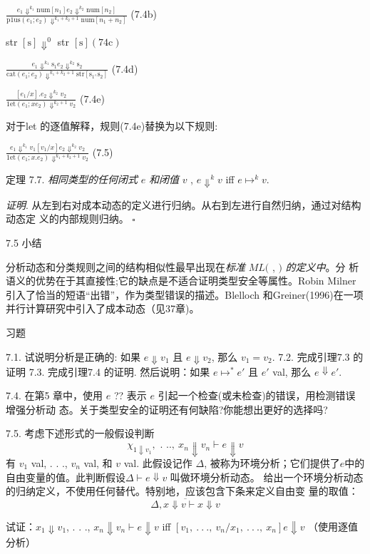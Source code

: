 \begin{center}
$\displaystyle \frac{e_{1}\Downarrow^{k_{1}}\mathrm{n}\mathrm{u}\mathrm{m}[n_{1}]e_{2}\Downarrow^{k_{2}}\mathrm{n}\mathrm{u}\mathrm{m}[n_{2}]}{\mathrm{p}1\mathrm{u}\mathrm{s}(e_{1};e_{2})\Downarrow^{k_{1}+k_{2}+1}\mathrm{n}\mathrm{u}\mathrm{m}[n_{1}+n_{2}]}$   (7.4b)
\end{center}
str $[\mathrm{s}] \Downarrow^{0}$ str $[\mathrm{s}] (74\mathrm{c})$
\begin{center}
$\displaystyle \frac{e_{1}\Downarrow^{k_{1}}\mathrm{s}_{1}e_{2}\Downarrow^{k_{2}}\mathrm{s}_{2}}{\mathrm{c}\mathrm{a}\mathrm{t}(e_{1};e_{2})\Downarrow^{k_{1}+k_{2}+1}\mathrm{s}\mathrm{t}\mathrm{r}[\mathrm{s}_{1^{\wedge}}\mathrm{s}_{2}]}$   (7.4d)

$\displaystyle \frac{[e_{1}/x].e_{2}\Downarrow^{k_{2}}v_{2}}{1\mathrm{e}\mathrm{t}(e_{1};xe_{2})\Downarrow^{k_{2}+1}v_{2}}$   (7.4e)
\end{center}
对于let 的逐值解释，规则(7.4e)替换为以下规则:
\begin{center}
$\displaystyle \frac{e_{1}\Downarrow^{k_{1}}v_{1}[v_{1}/x]e_{2}\Downarrow^{k_{2}}v_{2}}{1\mathrm{e}\mathrm{t}(e_{1};x.e_{2})\Downarrow^{k_{1}+k_{2}+1}v_{2}}$   (7.5)
\end{center}
定理 7.7. {\it 相同类型的任何闭式} $e$ {\it 和闭值} $v$ , $e\Downarrow^{k}v$ iff $e\mapsto^{k}v.$

{\it 证明}. 从左到右对成本动态的定义进行归纳。从右到左进行自然归纳，通过对结构动态定
义的内部规则归纳。 $\square $

7.5 小结

分析动态和分类规则之间的结构相似性最早出现在{\it 标准} $ML ($ , $)$ {\it 的定义中}。分
析语义的优势在于其直接性;它的缺点是不适合证明类型安全等属性。Robin Milner 引入了恰当的短语“出错”，作为类型错误的描述。Blelloch 和Greiner(1996)在一项并行计算研究中引入了成本动态（见37章)。

习题

7.1. 试说明分析是正确的:  如果 $e\Downarrow v_{1}$ 且 $e\Downarrow v_{2}$, 那么 $v_{1} =v_{2}.$
7.2.  完成引理7.3 的证明 
7.3.  完成引理7.4 的证明.  然后说明：如果 $e\mapsto^{*}e'$ 且 $e'$ val, 那么 $e\Downarrow e'.$

7.4. 在第5 章中，使用 $e$ ?? 表示 $e$ 引起一个检查(或未检查)的错误，用检测错误增强分析动
态。关于类型安全的证明还有何缺陷?你能想出更好的选择吗? 

7.5. 考虑下述形式的一般假设判断
$$
\chi_{1\Downarrow v_{1}},\text{ . }..,\ x_{n}\Downarrow v_{n}\vdash e\Downarrow v
$$
有 $v_{1}$ val, . . ., $v_{n}$ val, 和 $v$ val. 此假设记作 $\Delta$, 被称为环境分析；它们提供了$e$中的自由变量的值。此判断假设$\Delta\vdash e\Downarrow v$ 叫做环境分析动态。
给出一个环境分析动态的归纳定义，不使用任何替代。特别地，应该包含下条来定义自由变
量的取值：
$$
\overline{\Delta,x\Downarrow v\vdash x\Downarrow v}
$$

试证：$x_{1} \Downarrow v_{1}$, . . ., $x_{n} \Downarrow v_{n} \vdash e \Downarrow v$ iff $[v_{1},\ .\ .\ .,\ v_{n}/x_{1},\ .\ .\ .,\ x_{n}]e \Downarrow v$ （使用逐值分析）
